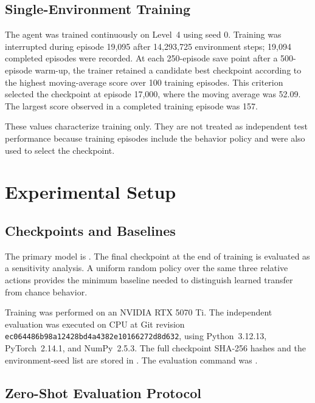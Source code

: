 \documentclass[journal]{IEEEtran}
\begin{document}
\subsection{Single-Environment Training}

The agent was trained continuously on Level~4 using seed 0. Training was
interrupted during episode 19,095 after 14,293,725 environment steps; 19,094
completed episodes were recorded. At each 250-episode save point after a
500-episode warm-up, the trainer retained a candidate best checkpoint according
to the highest moving-average score over 100 training episodes. This criterion
selected the checkpoint at episode 17,000, where the moving average was 52.09.
The largest score observed in a completed training episode was 157.

These values characterize training only. They are not treated as independent
test performance because training episodes include the behavior policy and were
also used to select the checkpoint.

\section{Experimental Setup}
\label{sec:experimental-setup}

\subsection{Checkpoints and Baselines}

The primary model is
. The final
checkpoint at the end of training is evaluated as a sensitivity analysis. A
uniform random policy over the same three relative actions provides the minimum
baseline needed to distinguish learned transfer from chance behavior.

Training was performed on an NVIDIA RTX 5070 Ti. The independent evaluation was
executed on CPU at Git revision
\texttt{ec064486b98a12428bd4a4382e10166272d8d632}, using Python~3.12.13,
PyTorch~2.14.1, and NumPy~2.5.3. The full checkpoint SHA-256 hashes and the
environment-seed list are stored in
. The evaluation command was
.

\subsection{Zero-Shot Evaluation Protocol}
\end{document}
